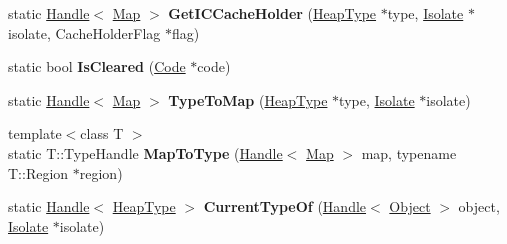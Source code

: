 \begin{DoxyCompactItemize}
\item 
\hypertarget{classv8_1_1internal_1_1_i_c_aed8a8aab51c480cbcd2fa8c2592f4846}{}static \hyperlink{classv8_1_1internal_1_1_handle}{Handle}$<$ \hyperlink{classv8_1_1internal_1_1_map}{Map} $>$ {\bfseries Get\+I\+C\+Cache\+Holder} (\hyperlink{classv8_1_1internal_1_1_type_impl}{Heap\+Type} $\ast$type, \hyperlink{classv8_1_1internal_1_1_isolate}{Isolate} $\ast$isolate, Cache\+Holder\+Flag $\ast$flag)\label{classv8_1_1internal_1_1_i_c_aed8a8aab51c480cbcd2fa8c2592f4846}

\item 
\hypertarget{classv8_1_1internal_1_1_i_c_adc7afc0f4fc8f19853c3d8946c9a2056}{}static bool {\bfseries Is\+Cleared} (\hyperlink{classv8_1_1internal_1_1_code}{Code} $\ast$code)\label{classv8_1_1internal_1_1_i_c_adc7afc0f4fc8f19853c3d8946c9a2056}

\item 
\hypertarget{classv8_1_1internal_1_1_i_c_a2bc19703c56728e8d726b87638f44617}{}static \hyperlink{classv8_1_1internal_1_1_handle}{Handle}$<$ \hyperlink{classv8_1_1internal_1_1_map}{Map} $>$ {\bfseries Type\+To\+Map} (\hyperlink{classv8_1_1internal_1_1_type_impl}{Heap\+Type} $\ast$type, \hyperlink{classv8_1_1internal_1_1_isolate}{Isolate} $\ast$isolate)\label{classv8_1_1internal_1_1_i_c_a2bc19703c56728e8d726b87638f44617}

\item 
\hypertarget{classv8_1_1internal_1_1_i_c_a762a3ba301cc6b4d47c71bb7a2fbb3da}{}{\footnotesize template$<$class T $>$ }\\static T\+::\+Type\+Handle {\bfseries Map\+To\+Type} (\hyperlink{classv8_1_1internal_1_1_handle}{Handle}$<$ \hyperlink{classv8_1_1internal_1_1_map}{Map} $>$ map, typename T\+::\+Region $\ast$region)\label{classv8_1_1internal_1_1_i_c_a762a3ba301cc6b4d47c71bb7a2fbb3da}

\item 
\hypertarget{classv8_1_1internal_1_1_i_c_adbf7915e7def60a2d2b5d19c269202fa}{}static \hyperlink{classv8_1_1internal_1_1_handle}{Handle}$<$ \hyperlink{classv8_1_1internal_1_1_type_impl}{Heap\+Type} $>$ {\bfseries Current\+Type\+Of} (\hyperlink{classv8_1_1internal_1_1_handle}{Handle}$<$ \hyperlink{classv8_1_1internal_1_1_object}{Object} $>$ object, \hyperlink{classv8_1_1internal_1_1_isolate}{Isolate} $\ast$isolate)\label{classv8_1_1internal_1_1_i_c_adbf7915e7def60a2d2b5d19c269202fa}

\end{DoxyCompactItemize}
